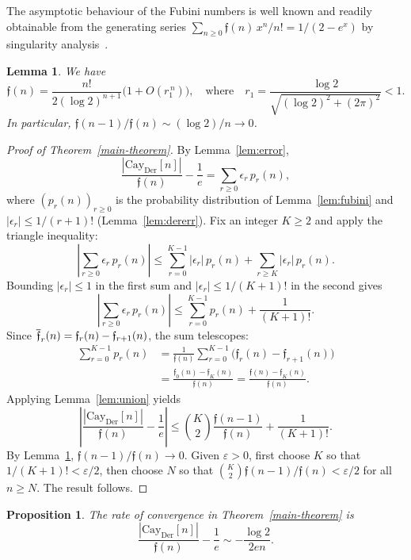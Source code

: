 \documentclass[a4paper,11pt,UKenglish]{article}
\newcommand{\Der}{\mathrm{Der}}
\newcommand{\Cay}{\mathrm{Cay}}
\newcommand{\fub}[1]{\mathfrak{f}(#1)}
\newcommand{\rfub}[2]{\mathfrak{f}_{#2}(#1)}
\newcommand{\sfub}[2]{%
  \overset{\raisebox{-0.2ex}{\rule{0.41em}{0.05em}}}%
  {\mathfrak{f}}_{#2}(#1)}
\newcommand{\CayDer}{\Cay_{\Der}}
\newtheorem{proposition}[theorem]{Proposition}
\newtheorem{lemma}[theorem]{Lemma}
\theoremstyle{definition}
\begin{document}
The asymptotic behaviour of the Fubini numbers is well known and
readily obtainable from the generating series
$\sum_{n \geq 0} \fub{n}\, x^n/n! = 1/(2 - e^x)$
by singularity analysis~\cite{FS}.

\begin{lemma}\label{lem:fubini-asymp}
We have
\[
  \fub{n}
  = \frac{n!}{2(\log 2)^{n+1}}
    \bigl(1+O(r_1^{\,n})\bigr),
  \quad\text{where}\quad
  r_1
  = \frac{\log 2}{\sqrt{(\log 2)^2+(2\pi)^2}} <1.
\]
In particular, $\fub{n-1}/\fub{n} \sim (\log 2)/n \to 0$.
\end{lemma}

\begin{proof}[Proof of Theorem~\ref{main-theorem}]
By Lemma~\ref{lem:error},
\[
  \frac{|\CayDer[n]|}{\fub{n}} - \frac{1}{e}
  = \sum_{r \geq 0} \epsilon_r\, p_r(n),
\]
where $(p_r(n))_{r \geq 0}$ is the probability distribution
of Lemma~\ref{lem:fubini} and
$|\epsilon_r| \leq 1/(r+1)!$ (Lemma~\ref{lem:dererr}).
Fix an integer $K \geq 2$ and apply the triangle inequality:
\[
  \left|\sum_{r \geq 0} \epsilon_r\, p_r(n)\right|
  \leq \sum_{r=0}^{K-1} |\epsilon_r|\, p_r(n)
  + \sum_{r \geq K} |\epsilon_r|\, p_r(n).
\]
Bounding $|\epsilon_r| \leq 1$ in the first sum and
$|\epsilon_r| \leq 1/(K+1)!$ in the second gives
\[
  \left|\sum_{r \geq 0} \epsilon_r\, p_r(n)\right|
  \leq \sum_{r=0}^{K-1} p_r(n) + \frac{1}{(K+1)!}.
\]
Since $\sfub{n}{r} = \rfub{n}{r} - \rfub{n}{r+1}$,
the sum telescopes:
\begin{align*}
  \sum_{r=0}^{K-1} p_r(n)
  &= \frac{1}{\fub{n}}
     \sum_{r=0}^{K-1}
     \bigl(\rfub{n}{r} - \rfub{n}{r+1}\bigr) \\
  &= \frac{\rfub{n}{0} - \rfub{n}{K}}{\fub{n}}
  = \frac{\fub{n} - \rfub{n}{K}}{\fub{n}}.
\end{align*}
Applying Lemma~\ref{lem:union} yields
\[
  \left|\frac{|\CayDer[n]|}{\fub{n}} - \frac{1}{e}\right|
  \leq \binom{K}{2}\frac{\fub{n-1}}{\fub{n}}
  + \frac{1}{(K+1)!}.
\]
By Lemma~\ref{lem:fubini-asymp},
$\fub{n-1}/\fub{n} \to 0$.
Given $\varepsilon > 0$, first choose $K$ so that
$1/(K+1)! < \varepsilon/2$, then choose $N$ so that
$\binom{K}{2} \fub{n-1}/\fub{n} < \varepsilon/2$
for all $n \geq N$. The result follows.
\end{proof}

\begin{proposition}\label{prop:cayder-asymp}
The rate of convergence in Theorem~\ref{main-theorem} is
\[
  \frac{|\CayDer[n]|}{\fub{n}} - \frac{1}{e} \sim -\frac{\log 2}{2en}.
\]
\end{proposition}
\end{document}

